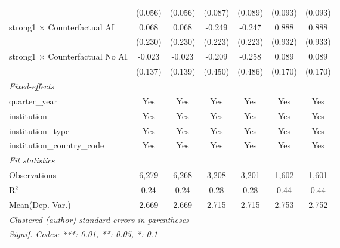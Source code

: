 \begin{tabular}{lcccccc}
                                          & (0.056)      & (0.056)      & (0.087) & (0.089) & (0.093)      & (0.093)\\   
   strong1 $\times$ Counterfactual AI     & 0.068        & 0.068        & -0.249  & -0.247  & 0.888        & 0.888\\   
                                          & (0.230)      & (0.230)      & (0.223) & (0.223) & (0.932)      & (0.933)\\   
   strong1 $\times$ Counterfactual No AI  & -0.023       & -0.023       & -0.209  & -0.258  & 0.089        & 0.089\\   
                                          & (0.137)      & (0.139)      & (0.450) & (0.486) & (0.170)      & (0.170)\\   
   \midrule
   \emph{Fixed-effects}\\
   quarter\_year                          & Yes          & Yes          & Yes     & Yes     & Yes          & Yes\\  
   institution                            & Yes          & Yes          & Yes     & Yes     & Yes          & Yes\\  
   institution\_type                      & Yes          & Yes          & Yes     & Yes     & Yes          & Yes\\  
   institution\_country\_code             & Yes          & Yes          & Yes     & Yes     & Yes          & Yes\\  
   \midrule
   \emph{Fit statistics}\\
   Observations                           & 6,279        & 6,268        & 3,208   & 3,201   & 1,602        & 1,601\\  
   R$^2$                                  & 0.24         & 0.24         & 0.28    & 0.28    & 0.44         & 0.44\\  
Mean(Dep. Var.) & 2.669 & 2.669 & 2.715 & 2.715 & 2.753 & 2.752 \\
   \midrule \midrule
   \multicolumn{7}{l}{\emph{Clustered (author) standard-errors in parentheses}}\\
   \multicolumn{7}{l}{\emph{Signif. Codes: ***: 0.01, **: 0.05, *: 0.1}}\\
\end{tabular}
\par\endgroup
